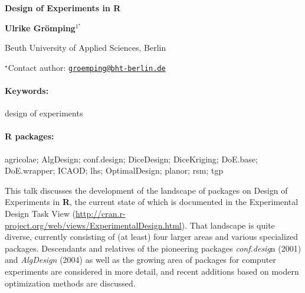\documentclass[11pt, a4paper]{article}
\renewcommand{\title}[1]{\begin{center}{\bf \LARGE #1}\end{center}}
\newcommand{\keywords}{\paragraph{Keywords:}}
\newcommand{\packages}{\paragraph{R packages:}}
\begin{document}
\pagestyle{empty}

\title{Design of Experiments in R}

\begin{center}
  {\bf Ulrike Grömping$^{1^\star}$}
\end{center}

\vskip 0.3cm

\begin{affiliations}
\begin{enumerate}
\begin{minipage}{0.915\textwidth}
\centering
\item Beuth University of Applied Sciences, Berlin \\[-2pt]
\end{minipage}
\end{enumerate}
$^\star$Contact author: \href{mailto:groemping@bht-berlin.de}{\nolinkurl{groemping@bht-berlin.de}}\\
\end{affiliations}

\vskip 0.5cm

\begin{minipage}{0.915\textwidth}
\keywords design of experiments
\packages agricolae; AlgDesign; conf.design; DiceDesign; DiceKriging; DoE.base;
DoE.wrapper; ICAOD; lhs; OptimalDesign; planor; rsm; tgp
\end{minipage}

\vskip 0.8cm

This talk discusses the development of the landscape of packages on
Design of Experiments in \textbf{R}, the current state of which is
documented in the Experimental Design Task View
(\url{http://cran.r-project.org/web/views/ExperimentalDesign.html}).
That landscape is quite diverse, currently consisting of (at least) four
larger areas and various specialized packages. Descendants and relatives
of the pioneering packages \emph{conf.desig}n (2001) and
\emph{AlgDesign} (2004) as well as the growing area of packages for
computer experiments are considered in more detail, and recent additions
based on modern optimization methods are discussed.
\end{document}
